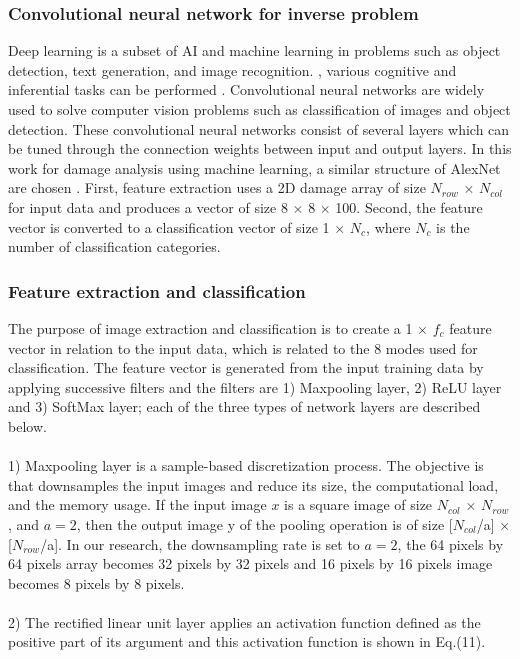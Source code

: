 \subsubsection{Convolutional neural network for inverse problem}
\label{subsubsec3}
Deep learning is a subset of AI and machine learning {} in problems such as object detection, text generation, and image recognition.
{}, various cognitive and inferential tasks can be performed \cite{Ref23,Ref24,Ref25}.
Convolutional neural networks are widely used to solve computer vision problems such as classification of images and object detection.
These convolutional neural networks consist of several layers which can be tuned through the connection weights between input and output layers.
In this work for damage analysis using machine learning, a similar structure of AlexNet are chosen \cite{Ref26}.
{}
First, feature extraction uses a 2D damage array of size $N_{row}$ $\times$ $N_{col}$ for input data and produces a vector of size 8 $\times$ 8 $\times$ 100.
Second, the feature vector is converted to a classification vector of size 1 $\times$ $N_{c}$, where $N_{c}$ is the number of classification categories.
{}

\subsubsection{Feature extraction and classification}
\label{subsubsec3}
The purpose of image extraction and classification is to create a 1 $\times$ $f_c$ feature vector in relation to the input data, which is related to the 8 modes used for classification.
The feature vector is generated from the input training data by applying successive filters and the filters are 1) Maxpooling layer, 2) ReLU layer and 3) SoftMax layer; each of the three types of network layers are described below.
\\
\\
1) Maxpooling layer \cite{Ref27} is a sample-based discretization process. The objective is that  downsamples the input images and reduce its size, the computational load, and the memory usage. If the input image $x$ is a square image of size $N_{col}$ $\times$ $N_{row}$, and $a = 2$, then the output image y of the pooling operation is of size [$N_{col}$/a] $\times$ [$N_{row}$/a]. In our research, the downsampling rate is set to $a = 2$,
the 64 pixels by 64 pixels array becomes 32 pixels by 32 pixels and 16 pixels by 16 pixels image becomes 8 pixels by 8 pixels.
\\
\\
2) The rectified linear unit layer \cite{Ref28} applies an activation function defined as the positive part of its argument and this activation function is shown in Eq.(11).

